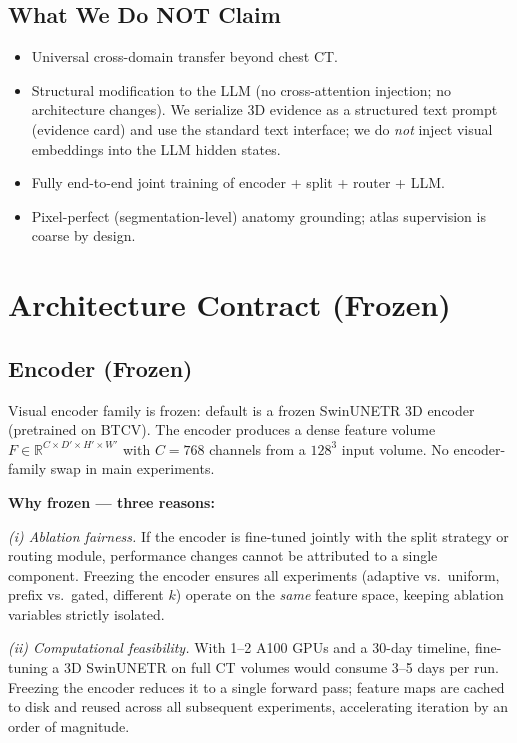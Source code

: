 \documentclass[11pt,a4paper]{article}
\newcommand{\RR}{\mathbb{R}}
\begin{document}
\subsection{What We Do NOT Claim}
\begin{itemize}[nosep]
    \item Universal cross-domain transfer beyond chest CT.
    \item Structural modification to the LLM (no cross-attention injection; no architecture changes). We serialize 3D evidence as a structured text prompt (evidence card) and use the standard text interface; we do \emph{not} inject visual embeddings into the LLM hidden states.
    \item Fully end-to-end joint training of encoder + split + router + LLM.
    \item Pixel-perfect (segmentation-level) anatomy grounding; atlas supervision is coarse by design.
\end{itemize}


\section{Architecture Contract (Frozen)}

\subsection{Encoder (Frozen)}
Visual encoder family is frozen: default is a frozen SwinUNETR 3D encoder (pretrained on BTCV).
The encoder produces a dense feature volume $F \in \RR^{C \times D' \times H' \times W'}$ with $C{=}768$ channels from a $128^3$ input volume.
No encoder-family swap in main experiments.

\textbf{Why frozen --- three reasons:}

\emph{(i) Ablation fairness.}
If the encoder is fine-tuned jointly with the split strategy or routing module, performance changes cannot be attributed to a single component. Freezing the encoder ensures all experiments (adaptive vs.\ uniform, prefix vs.\ gated, different $k$) operate on the \emph{same} feature space, keeping ablation variables strictly isolated.

\emph{(ii) Computational feasibility.}
With 1--2 A100 GPUs and a 30-day timeline, fine-tuning a 3D SwinUNETR on full CT volumes would consume 3--5 days per run. Freezing the encoder reduces it to a single forward pass; feature maps are cached to disk and reused across all subsequent experiments, accelerating iteration by an order of magnitude.
\end{document}
